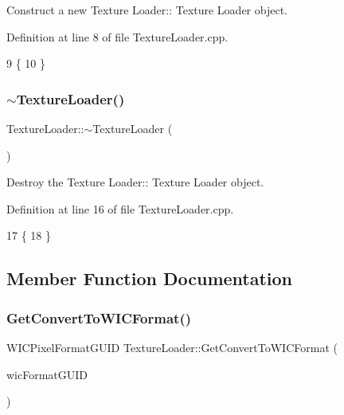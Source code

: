 Construct a new Texture Loader\+:\+: Texture Loader object. 



Definition at line 8 of file Texture\+Loader.\+cpp.


\begin{DoxyCode}
9 \{
10 \}
\end{DoxyCode}
\mbox{\label{class_texture_loader_aee3a49f73e5f88890658b17e9896c4f2}} 
\subsubsection{\texorpdfstring{$\sim$\+Texture\+Loader()}{~TextureLoader()}}
{\footnotesize\ttfamily Texture\+Loader\+::$\sim$\+Texture\+Loader (\begin{DoxyParamCaption}{ }\end{DoxyParamCaption})}



Destroy the Texture Loader\+:\+: Texture Loader object. 



Definition at line 16 of file Texture\+Loader.\+cpp.


\begin{DoxyCode}
17 \{
18 \}
\end{DoxyCode}


\subsection{Member Function Documentation}
\mbox{\label{class_texture_loader_a7a5e02ea4500b85ca7dc437f741bd90e}} 
\subsubsection{\texorpdfstring{Get\+Convert\+To\+W\+I\+C\+Format()}{GetConvertToWICFormat()}}
{\footnotesize\ttfamily W\+I\+C\+Pixel\+Format\+G\+U\+ID Texture\+Loader\+::\+Get\+Convert\+To\+W\+I\+C\+Format (\begin{DoxyParamCaption}\item[{W\+I\+C\+Pixel\+Format\+G\+U\+ID \&}]{wic\+Format\+G\+U\+ID }\end{DoxyParamCaption})\hspace{0.3cm}{\ttfamily [private]}}



